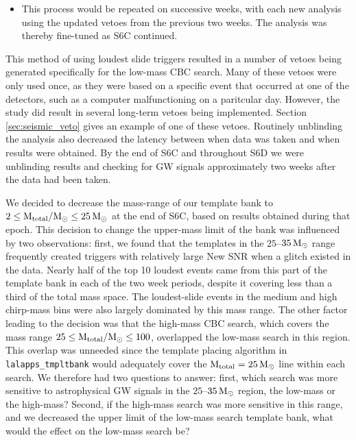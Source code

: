 \begin{itemize}
\item{This process would be repeated on successive weeks, with each new
analysis using the updated vetoes from the previous two weeks. The analysis was
thereby fine-tuned as S6C continued.}

\end{itemize}

This method of using loudest slide triggers resulted in a number of vetoes
being generated specifically for the low-mass \ac{CBC} search. Many of these
vetoes were only used once, as they were based on a specific event that
occurred at one of the detectors, such as a computer malfunctioning on a
paritcular day. However, the study did result in several long-term vetoes being
implemented. Section \ref{sec:seismic_veto} gives an example of one of these
vetoes. Routinely unblinding the analysis also decreased the latency between
when data was taken and when results were obtained. By the end of S6C and
throughout S6D we were unblinding results and checking for GW signals
approximately two weeks after the data had been taken. 

We decided to decrease the mass-range of our template bank to $2 \leq
\mathrm{M_{total}}/\mathrm{M_\odot} \leq 25\,\mathrm{M_\odot}$ at the end of S6C, based on results obtained
during that epoch. This decision to change the upper-mass limit of the bank was
influenced by two observations: first, we found that the templates in the
$25$--$35\,\mathrm{M_\odot}$ range frequently created triggers with relatively large New
SNR when a glitch existed in the data. Nearly half of the top 10 loudest events
came from this part of the template bank in each of the two week periods,
despite it covering less than a third of the total mass space. The
loudest-slide events in the medium and high chirp-mass bins were also largely
dominated by this mass range. The other factor leading to the decision was that
the high-mass \ac{CBC} search, which covers the mass range $25 \leq
\mathrm{M_{total}}/\mathrm{M_\odot} \leq 100$, overlapped the low-mass search in this region. This
overlap was unneeded since the template placing algorithm in
\texttt{lalapps\_tmpltbank} would adequately cover the $\mathrm{M_{total}} = 25\,\mathrm{M_\odot}$
line within each search. We therefore had two questions to answer: first, which
search was more sensitive to astrophysical GW signals in the $25$--$35\,\mathrm{M_\odot}$
region, the low-mass or the high-mass? Second, if the high-mass search was more
sensitive in this range, and we decreased the upper limit of the low-mass
search template bank, what would the effect on the low-mass search be?

